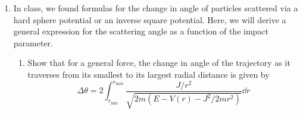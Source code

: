 \documentclass[../psets.tex]{subfiles}
\begin{document}
\begin{enumerate}
\begin{enumerate}
\begin{proof}
            In the case $\alpha>\beta$, the orbits are of the form
            \begin{align*}
                1 &= r^2(A\cos^2\theta+B\sin^2\theta)\\
                1 &= Ax^2+By^2
            \end{align*}
            for $A,B>0$. In other words, \par
            Lastly, note that the orbits of the attractive harmonic oscillator potential would be bounded, so an unbounded  This echoes the boundedness/unboundness of the two cases in part (a).
        \end{proof}
        \item For the attractive case, show that the condition for a real orbit recovers the value of $E=U_\text{min}$ that you derived in part (A).
        \begin{proof}
            The condition for a real orbit is that
            \begin{equation*}
                \frac{E^2}{4\gamma^2}-\frac{k}{2\gamma} \geq 0
            \end{equation*}
            Simplifying, we obtain
            \begin{align*}
                E^2 &\geq 2\gamma k\\
                E^2 &\geq \frac{J^2k}{m}\\
                E &\geq J\sqrt{\frac{k}{m}} = U_\text{min}
            \end{align*}
            as desired.
        \end{proof}
    \end{enumerate}
    \item In class, we found formulas for the change in angle of particles scattered via a hard sphere potential or an inverse square potential. Here, we will derive a general expression for the scattering angle as a function of the impact parameter.
    \begin{enumerate}
        \item Show that for a general force, the change in angle of the trajectory as it traverses from its smallest to its largest radial distance is given by
        \begin{equation*}
            \Delta\theta = 2\int_{r_\text{min}}^{r_\text{max}}\frac{J/r^2}{\sqrt{2m(E-V(r)-J^2/2mr^2)}}\dd{r}
        \end{equation*}

\end{enumerate}
\end{enumerate}
\end{document}
